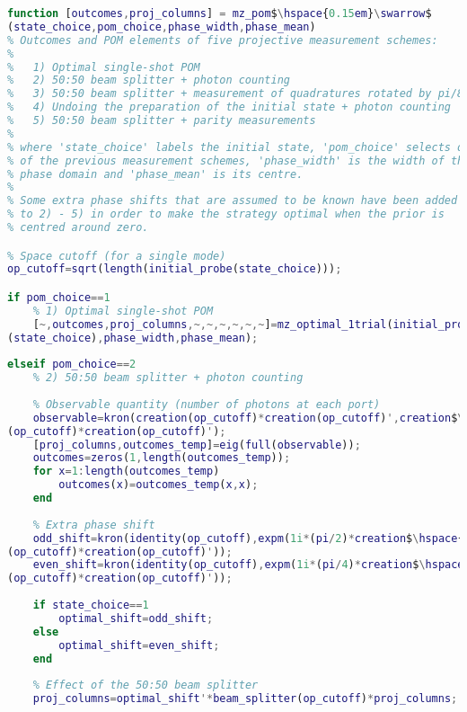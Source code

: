 \begin{lstlisting}[language=Matlab, mathescape=true]
function [outcomes,proj_columns] = mz_pom$\hspace{0.15em}\swarrow$
(state_choice,pom_choice,phase_width,phase_mean)
% Outcomes and POM elements of five projective measurement schemes:
%
%   1) Optimal single-shot POM
%   2) 50:50 beam splitter + photon counting
%   3) 50:50 beam splitter + measurement of quadratures rotated by pi/8
%   4) Undoing the preparation of the initial state + photon counting
%   5) 50:50 beam splitter + parity measurements
%
% where 'state_choice' labels the initial state, 'pom_choice' selects one
% of the previous measurement schemes, 'phase_width' is the width of the 
% phase domain and 'phase_mean' is its centre. 
%
% Some extra phase shifts that are assumed to be known have been added 
% to 2) - 5) in order to make the strategy optimal when the prior is 
% centred around zero.

% Space cutoff (for a single mode)
op_cutoff=sqrt(length(initial_probe(state_choice)));

if pom_choice==1
    % 1) Optimal single-shot POM
    [~,outcomes,proj_columns,~,~,~,~,~,~]=mz_optimal_1trial(initial_probe$\hspace{0.15em}\swarrow$
(state_choice),phase_width,phase_mean);
    
elseif pom_choice==2
    % 2) 50:50 beam splitter + photon counting
        
    % Observable quantity (number of photons at each port)
    observable=kron(creation(op_cutoff)*creation(op_cutoff)',creation$\hspace{0.15em}\swarrow$
(op_cutoff)*creation(op_cutoff)');
    [proj_columns,outcomes_temp]=eig(full(observable));
    outcomes=zeros(1,length(outcomes_temp));
    for x=1:length(outcomes_temp)
        outcomes(x)=outcomes_temp(x,x);
    end
    
    % Extra phase shift
    odd_shift=kron(identity(op_cutoff),expm(1i*(pi/2)*creation$\hspace{0.15em}\swarrow$
(op_cutoff)*creation(op_cutoff)'));
    even_shift=kron(identity(op_cutoff),expm(1i*(pi/4)*creation$\hspace{0.15em}\swarrow$
(op_cutoff)*creation(op_cutoff)'));
    
    if state_choice==1
        optimal_shift=odd_shift;
    else
        optimal_shift=even_shift;
    end
    
    % Effect of the 50:50 beam splitter
    proj_columns=optimal_shift'*beam_splitter(op_cutoff)*proj_columns;
    

\end{lstlisting}
